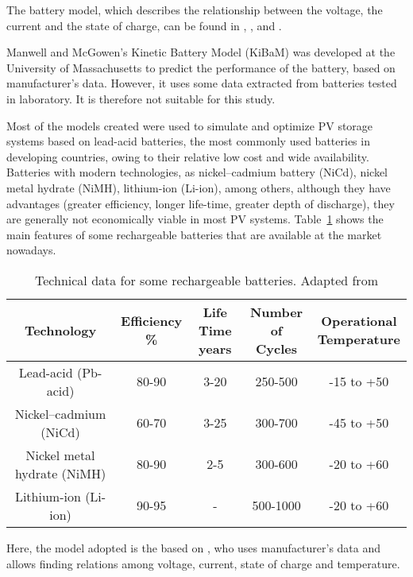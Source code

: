 The battery model, which describes the relationship between the voltage, the current and the state of charge, can be found in \cite{Copetti}, \cite{Manwell93}, and \cite{Manwell94}.  

Manwell and McGowen's Kinetic Battery Model (KiBaM)  \cite{Manwell93} was developed at the University of Massachusetts to predict the performance of the battery, based on manufacturer's data. However, it uses some data extracted from batteries tested in laboratory. It is therefore not suitable for this study. 

Most of the models created were used to simulate and optimize PV storage systems based on lead-acid batteries, the most commonly used batteries in developing countries, owing to their relative low cost and wide availability. %
Batteries with modern technologies, as nickel–cadmium battery (NiCd), nickel metal hydrate (NiMH), lithium-ion (Li-ion), among others, although they have advantages (greater efficiency, longer life-time, greater depth of discharge), they are generally not economically viable in most PV systems. Table~\ref{table:batteries} shows the main features of some rechargeable batteries that are available at the market nowadays.

\begin{table}[!t]
\renewcommand{\arraystretch}{1.3}
\caption{Technical data for some rechargeable batteries. Adapted from \cite{Pinho}}
\label{table:batteries}
\centering
\begin{tabular}{c | c | c | c | c }
\hline
\hline
Technology & \makecell{Efficiency \\ \%} & \makecell{Life Time \\ years} & \makecell{Number of \\ Cycles} & \makecell{Operational \\ Temperature}\\
\hline
Lead-acid (Pb-acid) & 80-90 & 3-20 & 250-500 & -15 to +50 \\
\hline
Nickel–cadmium (NiCd) & 60-70 & 3-25 & 300-700 & -45 to +50 \\
\hline
Nickel metal hydrate (NiMH) & 80-90 & 2-5 & 300-600 & -20 to +60 \\
\hline
Lithium-ion (Li-ion) & 90-95 & - & 500-1000 & -20 to +60 \\
\hline
\hline
\end{tabular}
\end{table}

Here, the model adopted is the based on \cite{Copetti}, who uses manufacturer's data and allows finding relations among voltage, current, state of charge and temperature. 

